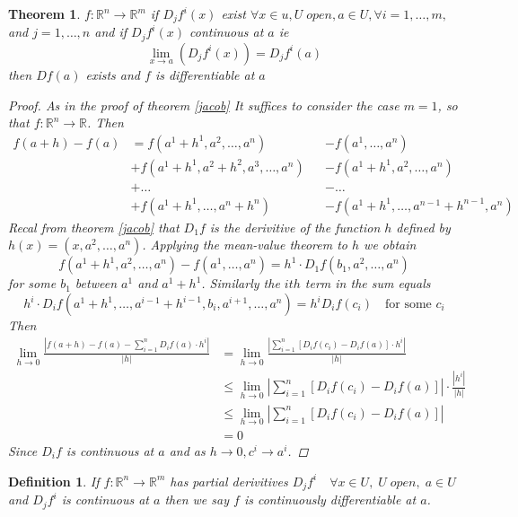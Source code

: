 \documentclass[11pt]{article}
\def\RR{\mathbb{R}}
\newtheorem{theorem}{Theorem}[section]
\newtheorem{definition}{Definition}[section]
\begin{document}
\begin{theorem}
 $f:\RR^n \rightarrow \RR^m $ if $D_{j}f^{i}(x)$ exist $ \forall x \in u, U\; open,  a \in U,  \forall i = 1,\dots, m,$ and $ j = 1, \dots, n$ and if $D_{j}f^{i}(x)$ continuous at $a$ ie 
\[\lim_{x \rightarrow a}(D_{j}f^{i}(x)) = D_{j}f^{i}(a)\]
then $Df(a)$ exists and $f$ is differentiable at $a$
\begin{proof}
As in the proof of theorem \ref{jacob} It suffices to consider the case $ m=1$, so that $f:\RR^n \rightarrow \RR$. Then
\begin{align*}
f(a+ h) - f(a) &= f(a^{1} + h^{1}, a^{2}, \dots , a^{n}) &&- f(a^{1}, \dots , a^{n})\\
&+ f(a^1 + h^1 , a^2 + h^2, a^3 , \dots , a^n ) &&-  f(a^{1} + h^1 , a^2 ,  \dots , a^{n})\\
&+ \dots  &&- \dots\\
&+ f(a^1 + h^1 ,\dots ,  a^n + h^n ) &&-  f(a^{1} + h^1 ,  \dots, a^{n-1} + h^{n-1} , a^{n})
\end{align*}
Recal from theorem \ref{jacob} that $D_{1}f$ is the derivitive of the function $h$ defined by\\ $h(x) = (x, a^2 , \dots , a^n )$. Applying the mean-value theorem to $h$ we obtain
\[ f(a^{1} + h^{1}, a^{2}, \dots , a^{n}) - f(a^{1}, \dots , a^{n}) = h^{1} \cdot D_{1}f(b_{1}, a^{2} , \dots, a^{n}) \]
for some $b_{1}$ between $a^1 $ and $a^1 + h^1 $. Similarly the $ith$ term in the sum equals 
\[h^{i} \cdot D_{i}f(a^1 + h^1 ,\dots ,  a^{i-1} + h^{i-1},  b_{i}, a^{i+1}, \dots , a^n ) = h^{i}D_{i}f(c_{i}) \quad \text{for some $c_{i}$} \]
Then
\begin{align*}
\lim_{h \rightarrow 0}\frac{|f(a+h) - f(a) - \sum_{i=1}^{n}D_{i}f(a) \cdot h^{i}|}{|h|} &= \lim_{h \rightarrow 0}\frac{| \sum_{i=1}^{n}[D_{i}f(c_{i}) - D_{i}f(a) ]\cdot h^{i}|}{|h|}\\
 & \leq \lim_{h \rightarrow 0}| \sum_{i=1}^{n}[D_{i}f(c_{i}) - D_{i}f(a)]|\cdot \frac{| h^{i}|}{|h|}\\
 & \leq \lim_{h \rightarrow 0}| \sum_{i=1}^{n}[D_{i}f(c_{i}) - D_{i}f(a)]|\\
&=0
\end{align*}
Since $D_{i}f$ is continuous at $a$ and as $h \rightarrow 0, c^{i} \rightarrow  a^{i}$.
\end{proof}
\end{theorem}

\begin{definition} If $f:\RR^n \rightarrow \RR^m$ has partial derivitives $ D_{j}f^{i} \quad \forall x \in U , \; U \; open, \;  a \in U$ and $D_{j}f^{i}$ is continuous at $a$ then we say $f$ is continuously differentiable at $a$. 
\end{definition}
\end{document}
